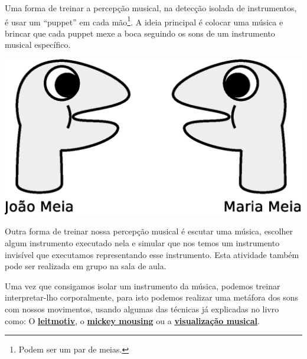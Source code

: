\noindent
\begin{minipage}[b]{0.6\linewidth}
\begin{example}
Uma forma de treinar a percepção musical, na detecção isolada de instrumentos, 
é usar um ``puppet'' em cada mão\footnote{Podem ser um par de meias.}.
A ideia principal é colocar uma música e brincar que cada puppet 
mexe a boca seguindo os sons de um instrumento musical específico.
\end{example}
\end{minipage}
\begin{minipage}[b]{0.4\linewidth}
      \includegraphics[width=.975\linewidth]{chapters/cap-musicalidade-tecnica/puppets}  
\end{minipage}

\begin{example}
Outra forma de treinar nossa percepção musical é escutar uma música,
escolher algum instrumento executado nela e simular que nos temos um 
instrumento invisível que executamos representando esse instrumento. 
Esta atividade também pode ser realizada em grupo na sala de aula.
\end{example}

\begin{example}
Uma vez que consigamos isolar um instrumento da música, 
podemos treinar interpretar-lho corporalmente, para isto podemos
 realizar uma metáfora dos sons com nossos movimentos, 
usando algumas das técnicas já explicadas no livro como: O 
\hyperref[sec:leitmotivdanca]{\textbf{leitmotiv}}, o
\hyperref[sec:mikeymousing]{\textbf{mickey mousing}} ou
a  \hyperref[subsubsec:musicvisualization]{\textbf{visualização musical}}.
\end{example}

